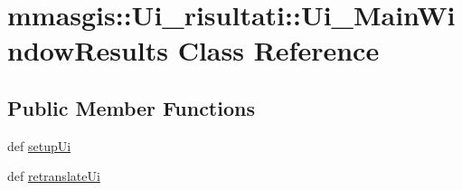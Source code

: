 \hypertarget{classmmasgis_1_1Ui__risultati_1_1Ui__MainWindowResults}{
\section{mmasgis::Ui\_\-risultati::Ui\_\-MainWindowResults Class Reference}
\label{classmmasgis_1_1Ui__risultati_1_1Ui__MainWindowResults}
}
\subsection*{Public Member Functions}
\begin{DoxyCompactItemize}
\item 
def \hyperlink{classmmasgis_1_1Ui__risultati_1_1Ui__MainWindowResults_a5323be1879322f07472f7fac33d7daff}{setupUi}
\item 
def \hyperlink{classmmasgis_1_1Ui__risultati_1_1Ui__MainWindowResults_ac4ff3146928d5156d5b557006916e993}{retranslateUi}
\end{DoxyCompactItemize}
